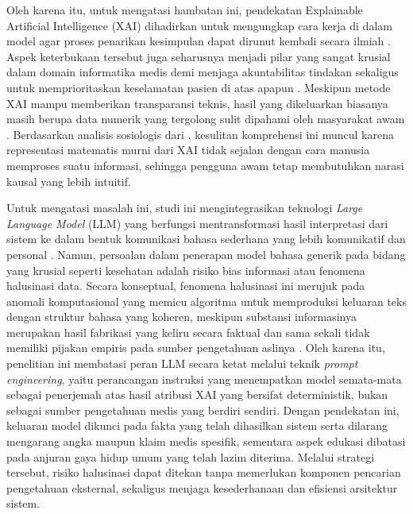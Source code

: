 Oleh karena itu, untuk mengatasi hambatan ini, pendekatan Explainable Artificial Intelligence (XAI) dihadirkan untuk mengungkap cara kerja di dalam model agar proses penarikan kesimpulan dapat dirunut kembali secara ilmiah \autocite{Adadi2018}. Aspek keterbukaan tersebut juga seharusnya menjadi pilar yang sangat krusial dalam domain informatika medis demi menjaga akuntabilitas tindakan sekaligus untuk memprioritaskan keselamatan pasien di atas apapun  \autocite{Holzinger2019}. Meskipun metode XAI mampu memberikan transparansi teknis, hasil yang dikeluarkan biasanya masih berupa data numerik yang tergolong sulit dipahami oleh masyarakat awam \autocite{liao2021human}. Berdasarkan analisis sosiologis dari \textcite{miller2019explanation}, kesulitan komprehensi ini muncul karena representasi matematis murni dari XAI tidak sejalan dengan cara manusia memproses suatu informasi, sehingga pengguna awam tetap membutuhkan narasi kausal yang lebih intuitif. 



Untuk mengatasi masalah ini, studi ini mengintegrasikan teknologi \textit{Large Language Model} (LLM) yang berfungsi mentransformasi hasil interpretasi dari sistem ke dalam bentuk komunikasi bahasa sederhana yang lebih komunikatif dan personal \autocite{Thirunavukarasu2023Large}. Namun, persoalan dalam penerapan model bahasa generik pada bidang yang krusial seperti kesehatan adalah risiko bias informasi atau fenomena halusinasi data. Secara konseptual, fenomena halusinasi ini merujuk pada anomali komputasional yang memicu algoritma untuk memproduksi keluaran teks dengan struktur bahasa yang koheren, meskipun substansi informasinya merupakan hasil fabrikasi yang keliru secara faktual dan sama sekali tidak memiliki pijakan empiris pada sumber pengetahuan aslinya \autocite{Ji2023Survey}. Oleh karena itu, penelitian ini membatasi peran LLM secara ketat melalui teknik \textit{prompt engineering}, yaitu perancangan instruksi yang menempatkan model semata-mata sebagai penerjemah atas hasil atribusi XAI yang bersifat deterministik, bukan sebagai sumber pengetahuan medis yang berdiri sendiri. Dengan pendekatan ini, keluaran model dikunci pada fakta yang telah dihasilkan sistem serta dilarang mengarang angka maupun klaim medis spesifik, sementara aspek edukasi dibatasi pada anjuran gaya hidup umum yang telah lazim diterima. Melalui strategi tersebut, risiko halusinasi dapat ditekan tanpa memerlukan komponen pencarian pengetahuan eksternal, sekaligus menjaga kesederhanaan dan efisiensi arsitektur sistem.

